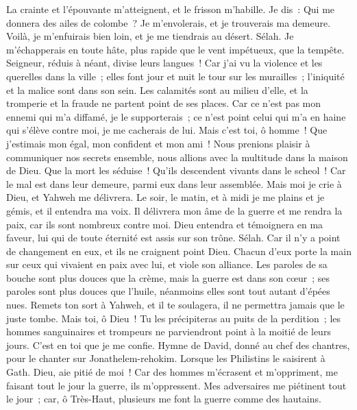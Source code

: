 \begin{multicols}{2}
La crainte et l'épouvante m'atteignent, et le frisson m'habille.
Je dis~: Qui me donnera des ailes de colombe~? Je m'envolerais, et je trouverais ma demeure.
Voilà, je m'enfuirais bien loin, et je me tiendrais au désert. Sélah.
Je m'échapperais en toute hâte, plus rapide que le vent impétueux, que la tempête.
Seigneur, réduis à néant, divise leurs langues~! Car j'ai vu la violence et les querelles dans la ville~;
elles font jour et nuit le tour sur les murailles~; l'iniquité et la malice sont dans son sein.
Les calamités sont au milieu d'elle, et la tromperie et la fraude ne partent point de ses places.
Car ce n'est pas mon ennemi qui m'a diffamé, je le supporterais~; ce n'est point celui qui m'a en haine qui s'élève contre moi, je me cacherais de lui.
Mais c'est toi, ô homme~! Que j'estimais mon égal, mon confident et mon ami~!
Nous prenions plaisir à communiquer nos secrets ensemble, nous allions avec la multitude dans la maison de Dieu.
Que la mort les séduise~! Qu'ils descendent vivants dans le scheol~! Car le mal est dans leur demeure, parmi eux dans leur assemblée.
Mais moi je crie à Dieu, et Yahweh me délivrera.
Le soir, le matin, et à midi je me plains et je gémis, et il entendra ma voix.
Il délivrera mon âme de la guerre et me rendra la paix, car ils sont nombreux contre moi.
Dieu entendra et témoignera en ma faveur, lui qui de toute éternité est assis sur son trône. Sélah. Car il n'y a point de changement en eux, et ils ne craignent point Dieu.
Chacun d'eux porte la main sur ceux qui vivaient en paix avec lui, et viole son alliance.
Les paroles de sa bouche sont plus douces que la crème, mais la guerre est dans son cœur~; ses paroles sont plus douces que l'huile, néanmoins elles sont tout autant d'épées nues.
Remets ton sort à Yahweh, et il te soulagera, il ne permettra jamais que le juste tombe.
Mais toi, ô Dieu~! Tu les précipiteras au puits de la perdition~; les hommes sanguinaires et trompeurs ne parviendront point à la moitié de leurs jours. C'est en toi que je me confie.
\VerseOne{}Hymne de David, donné au chef des chantres, pour le chanter sur Jonathelem-rehokim. Lorsque les Philistins le saisirent à Gath.
Dieu, aie pitié de moi~! Car des hommes m'écrasent et m'oppriment, me faisant tout le jour la guerre, ils m'oppressent.
Mes adversaires me piétinent tout le jour~; car, ô Très-Haut, plusieurs me font la guerre comme des hautains.

\end{multicols}
